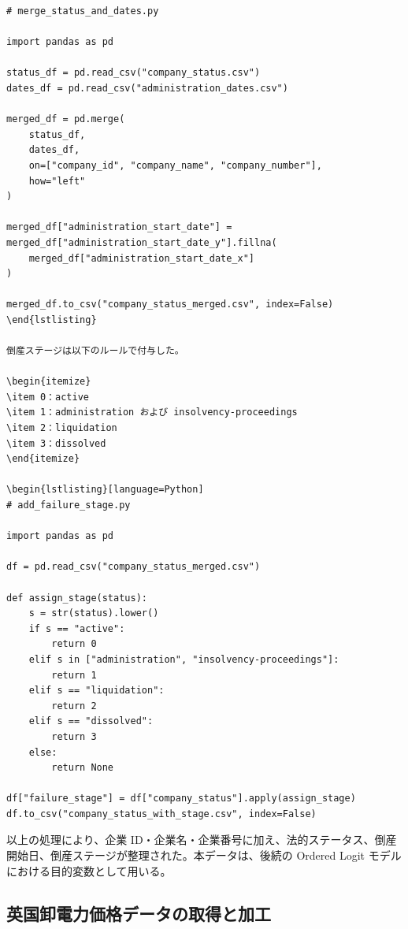 \begin{verbatim}
# merge_status_and_dates.py

import pandas as pd

status_df = pd.read_csv("company_status.csv")
dates_df = pd.read_csv("administration_dates.csv")

merged_df = pd.merge(
    status_df,
    dates_df,
    on=["company_id", "company_name", "company_number"],
    how="left"
)

merged_df["administration_start_date"] = merged_df["administration_start_date_y"].fillna(
    merged_df["administration_start_date_x"]
)

merged_df.to_csv("company_status_merged.csv", index=False)
\end{lstlisting}

倒産ステージは以下のルールで付与した。

\begin{itemize}
\item 0：active
\item 1：administration および insolvency-proceedings
\item 2：liquidation
\item 3：dissolved
\end{itemize}

\begin{lstlisting}[language=Python]
# add_failure_stage.py

import pandas as pd

df = pd.read_csv("company_status_merged.csv")

def assign_stage(status):
    s = str(status).lower()
    if s == "active":
        return 0
    elif s in ["administration", "insolvency-proceedings"]:
        return 1
    elif s == "liquidation":
        return 2
    elif s == "dissolved":
        return 3
    else:
        return None

df["failure_stage"] = df["company_status"].apply(assign_stage)
df.to_csv("company_status_with_stage.csv", index=False)
\end{verbatim}

以上の処理により、企業 ID・企業名・企業番号に加え、法的ステータス、倒産開始日、倒産ステージが整理された。本データは、後続の Ordered Logit モデルにおける目的変数として用いる。


\subsection*{英国卸電力価格データの取得と加工}

